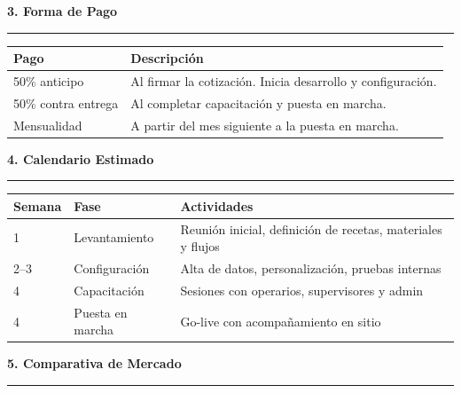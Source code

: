 \documentclass[11pt,letterpaper]{article}
\begin{document}
{\large\bfseries\color{tinta}3. Forma de Pago}\\[4pt]
{\color{pharmaazul}\rule{\linewidth}{0.8pt}}

\vspace{6pt}

\noindent\begin{tabularx}{\linewidth}{@{}l >{\raggedright\arraybackslash}X@{}}
\toprule
\textbf{Pago} & \textbf{Descripción} \\
\midrule
50\% anticipo & Al firmar la cotización. Inicia desarrollo y configuración. \\
50\% contra entrega & Al completar capacitación y puesta en marcha. \\
\midrule
Mensualidad & A partir del mes siguiente a la puesta en marcha. \\
\bottomrule
\end{tabularx}

\vspace{14pt}

{\large\bfseries\color{tinta}4. Calendario Estimado}\\[4pt]
{\color{pharmaazul}\rule{\linewidth}{0.8pt}}

\vspace{6pt}

\noindent\begin{tabularx}{\linewidth}{@{}l l >{\raggedright\arraybackslash}X@{}}
\toprule
\textbf{Semana} & \textbf{Fase} & \textbf{Actividades} \\
\midrule
1 & Levantamiento & Reunión inicial, definición de recetas, materiales y flujos \\
2--3 & Configuración & Alta de datos, personalización, pruebas internas \\
4 & Capacitación & Sesiones con operarios, supervisores y admin \\
4 & Puesta en marcha & Go-live con acompañamiento en sitio \\
\bottomrule
\end{tabularx}

\vspace{14pt}

{\large\bfseries\color{tinta}5. Comparativa de Mercado}\\[4pt]
{\color{pharmaazul}\rule{\linewidth}{0.8pt}}

\vspace{6pt}
\end{document}
